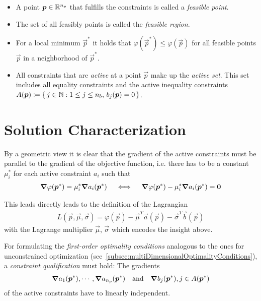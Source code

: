 	\begin{itemize}
		\item A point \( \bm{p} \in \mathbb{R}^{n_p} \) that fulfills the constraints is called a \emph{feasible point}.
		\item The set of all feasibly points is called the \emph{feasible region}.
		\item For a local minimum \( \vec{p}^\ast \) it holds that \( \varphi(\vec{p}^\ast) \leq \varphi(\vec{p}) \) for all feasible points \(\vec{p}\) in a neighborhood of \(\vec{p}^\ast\).
		\item All constraints that are \emph{active} at a point \(\vec{p}\) make up the \emph{active set}. This set includes all equality constraints and the active inequality constraints \( A(\bm{p}) \coloneqq \{\, j \in \mathbb{N} : 1 \leq j \leq n_b,\, b_j(\bm{p}) = 0 \,\} \).
	\end{itemize}

	\section{Solution Characterization}
		By a geometric view it is clear that the gradient of the active constraints must be parallel to the gradient of the objective function, i.e. there has to be a constant \( \mu_i^\ast \) for each active constraint \( a_i \) such that
		\begin{align*}
			\grad{\varphi}(\bm{p}^\ast) = \mu_i^\ast \grad{a_i}(\bm{p}^\ast)
			\quad\iff\quad
			\grad{\varphi}(\bm{p}^\ast) - \mu_i^\ast \grad{a_i}(\bm{p}^\ast) = \bm{0}
		\end{align*}

		This leads directly leads to the definition of the Lagrangian
		\begin{align*}
			L(\vec{p}, \vec{\mu}, \vec{\sigma}) = \varphi(\vec{p}) - \vec{\mu}^T \vec{a}(\vec{p}) - \vec{\sigma}^T \vec{b}(\vec{p})
		\end{align*}
		with the Lagrange multiplier \( \vec{\mu} \), \( \vec{\sigma} \) which encodes the insight above.

		For formulating the \emph{first-order optimality conditions} analogous to the ones for unconstrained optimization (see~\autoref{subsec:multiDimensionalOptimalityConditions}), a \emph{constraint qualification} must hold: The gradients
		\begin{align*}
			\grad{a_1}(\bm{p}^\ast), \cdots, \grad{a_{n_p}}(\bm{p}^\ast) \quad\text{and}\quad \grad{b_j}(\bm{p}^\ast), j \in A(\bm{p}^\ast)
		\end{align*}
		of the active constraints have to linearly independent.

